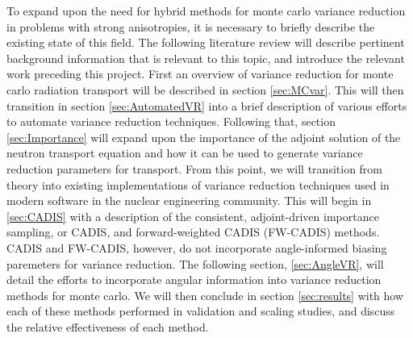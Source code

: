 To expand upon the need for hybrid methods for monte carlo variance reduction in problems with strong anisotropies, it is necessary to briefly describe the existing state of this field. The following literature review will describe pertinent background information that is relevant to this topic, and introduce the relevant work preceding this project. 
First an overview of variance reduction for monte carlo radiation transport will be described in section \ref{sec:MCvar}.
This will then transition in section \ref{sec:AutomatedVR} into a brief description of various efforts to automate variance reduction techniques. 
Following that, section \ref{sec:Importance} will expand upon the importance of the adjoint solution of the neutron transport equation and how it can be used to generate variance reduction parameters for transport.
From this point, we will transition from theory into existing implementations of variance reduction techniques used in modern software in the nuclear engineering community. This will begin in \ref{sec:CADIS} with a description of the consistent, adjoint-driven importance sampling, or CADIS, and forward-weighted CADIS (FW-CADIS) methods.
CADIS and FW-CADIS, however, do not incorporate angle-informed biasing paremeters for variance reduction. 
The following section, \ref{sec:AngleVR}, will detail the efforts to incorporate angular information into variance reduction methods for monte carlo. 
We will then conclude in section \ref{sec:results} with how each of these methods performed in validation and scaling studies, and discuss the relative effectiveness of each method. 